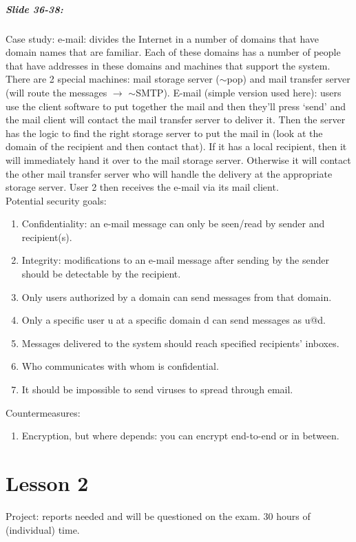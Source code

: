 \documentclass[10pt,a4paper]{report}
\begin{document}
\paragraph{Slide 36-38:} Case study: e-mail: divides the Internet in a number of domains that have domain names that are familiar. Each of these domains has a number of people that have addresses in these domains and machines that support the system. There are 2 special machines: mail storage server ($\sim$pop) and mail transfer server (will route the messages $\rightarrow$ $\sim$SMTP). E-mail (simple version used here): users use the client software to put together the mail and then they'll press `send' and the mail client will contact the mail transfer server to deliver it. Then the server has the logic to find the right storage server to put the mail in (look at the domain of the recipient and then contact that). If it has a local recipient, then it will immediately hand it over to the mail storage server. Otherwise it will contact the other mail transfer server who will handle the delivery at the appropriate storage server. User 2 then receives the e-mail via its mail client.\\

Potential security goals:
\begin{enumerate}
\item Confidentiality: an e-mail message can only be seen/read by sender and recipient(s).
\item Integrity: modifications to an e-mail message after sending by the sender should be detectable by the recipient.
\item Only users authorized by a domain can send messages from that domain.
\item Only a specific user u at a specific domain d can send messages as u@d.
\item Messages delivered to the system should reach specified recipients' inboxes.
\item Who communicates with whom is confidential.
\item It should be impossible to send viruses to spread through email.
\end{enumerate}
Countermeasures:
\begin{enumerate}
\item Encryption, but where depends: you can encrypt end-to-end or in between.
\end{enumerate}

\chapter{Lesson 2}
Project: reports needed and will be questioned on the exam. 30 hours of (individual) time. 
\end{document}

